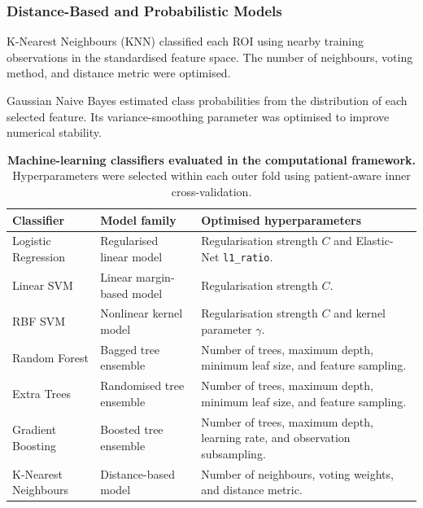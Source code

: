 \documentclass[12pt,twocolumn]{article}
\begin{document}
\subsubsection{Distance-Based and Probabilistic Models}
\label{subsubsec:distance_probabilistic_classifiers}

K-Nearest Neighbours (KNN) classified each ROI using nearby training
observations in the standardised feature space. The number of
neighbours, voting method, and distance metric were optimised.

Gaussian Naive Bayes estimated class probabilities from the
distribution of each selected feature. Its variance-smoothing
parameter was optimised to improve numerical stability.

\begin{table}[htbp]
\centering
\caption{\textbf{Machine-learning classifiers evaluated in the
computational framework.} Hyperparameters were selected within each
outer fold using patient-aware inner cross-validation.}
\label{tab:classifiers}
\small
\begin{tabular}{p{3.1cm} p{3.7cm} p{8.9cm}}
\toprule
\textbf{Classifier} &
\textbf{Model family} &
\textbf{Optimised hyperparameters} \\
\midrule

Logistic Regression &
Regularised linear model &
Regularisation strength \(C\) and Elastic-Net
\texttt{l1\_ratio}. \\

Linear SVM &
Linear margin-based model &
Regularisation strength \(C\). \\

RBF SVM &
Nonlinear kernel model &
Regularisation strength \(C\) and kernel parameter \(\gamma\). \\

Random Forest &
Bagged tree ensemble &
Number of trees, maximum depth, minimum leaf size, and feature
sampling. \\

Extra Trees &
Randomised tree ensemble &
Number of trees, maximum depth, minimum leaf size, and feature
sampling. \\

Gradient Boosting &
Boosted tree ensemble &
Number of trees, maximum depth, learning rate, and observation
subsampling. \\

K-Nearest Neighbours &
Distance-based model &
Number of neighbours, voting weights, and distance metric. \\


\end{tabular}
\end{table}
\end{document}

